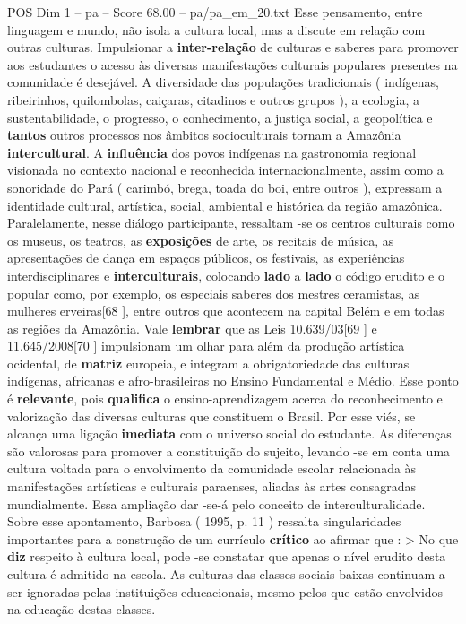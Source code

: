 \begin{textsample}{POS Dim 1 – pa – Score 68.00 – pa/pa\_em\_20.txt}
Esse pensamento, entre linguagem e mundo, não isola a cultura local, mas a discute em relação com outras culturas.
Impulsionar a \textbf{inter-relação} de culturas e saberes para promover aos estudantes o acesso às diversas manifestações culturais populares presentes na comunidade é desejável.
A diversidade das populações tradicionais ( indígenas, ribeirinhos, quilombolas, caiçaras, citadinos e outros grupos ), a ecologia, a sustentabilidade, o progresso, o conhecimento, a justiça social, a geopolítica e \textbf{tantos} outros processos nos âmbitos socioculturais tornam a Amazônia \textbf{intercultural}.
A \textbf{influência} dos povos indígenas na gastronomia regional visionada no contexto nacional e reconhecida internacionalmente, assim como a sonoridade do Pará ( carimbó, brega, toada do boi, entre outros ), expressam a identidade cultural, artística, social, ambiental e histórica da região amazônica.
Paralelamente, nesse diálogo participante, ressaltam -se os centros culturais como os museus, os teatros, as \textbf{exposições} de arte, os recitais de música, as apresentações de dança em espaços públicos, os festivais, as experiências interdisciplinares e \textbf{interculturais}, colocando \textbf{lado} a \textbf{lado} o código erudito e o popular como, por exemplo, os especiais saberes dos mestres ceramistas, as mulheres erveiras[68 ], entre outros que acontecem na capital Belém e em todas as regiões da Amazônia.
Vale \textbf{lembrar} que as Leis 10.639/03[69 ] e 11.645/2008[70 ] impulsionam um olhar para além da produção artística ocidental, de \textbf{matriz} europeia, e integram a obrigatoriedade das culturas indígenas, africanas e afro-brasileiras no Ensino Fundamental e Médio.
Esse ponto é \textbf{relevante}, pois \textbf{qualifica} o ensino-aprendizagem acerca do reconhecimento e valorização das diversas culturas que constituem o Brasil.
Por esse viés, se alcança uma ligação \textbf{imediata} com o universo social do estudante.
As diferenças são valorosas para promover a constituição do sujeito, levando -se em conta uma cultura voltada para o envolvimento da comunidade escolar relacionada às manifestações artísticas e culturais paraenses, aliadas às artes consagradas mundialmente.
Essa ampliação dar -se-á pelo conceito de interculturalidade.
Sobre esse apontamento, Barbosa ( 1995, p. 11 ) ressalta singularidades importantes para a construção de um currículo \textbf{crítico} ao afirmar que : > No que \textbf{diz} respeito à cultura local, pode -se constatar que apenas o nível erudito desta cultura é admitido na escola.
As culturas das classes sociais baixas continuam a ser ignoradas pelas instituições educacionais, mesmo pelos que estão envolvidos na educação destas classes.

\end{textsample}
